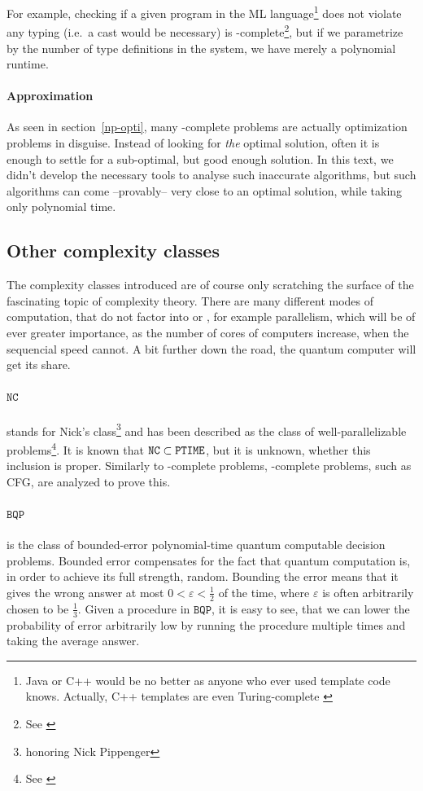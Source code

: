 For example, checking if a given program in the ML language\footnote{Java or
	C++ would be no better as anyone who ever used template code knows. Actually,
	C++ templates are even Turing-complete \cite{veldhuizen2003c++}}
does not violate any typing (i.e.\ a cast would be necessary) is
\NPTIME-complete\footnote{See \cite{downey1999parameterized}}, but if we
parametrize by the number of type definitions in the system, we have merely a
polynomial runtime.
\paragraph{Approximation}
As seen in section~\ref{np-opti}, many \NPTIME-complete problems are actually
optimization problems in disguise. Instead of looking for \emph{the} optimal
solution, often it is enough to settle for a sub-optimal, but good enough
solution.  In this text, we didn't develop the necessary tools to analyse such
inaccurate algorithms, but such algorithms can come --provably-- very close to
an optimal solution, while taking only polynomial time.

\subsection{Other complexity classes}
The complexity classes introduced are of course only scratching the surface 
of the fascinating topic of complexity theory. There are many different modes 
of computation, that do not factor into \PTIME or \NPTIME, for example 
parallelism, which will be of ever greater importance, as the number of cores 
of computers increase, when the sequencial speed cannot. A bit further down 
the road, the quantum computer will get its share.

\paragraph{$\mathtt{NC}$}
stands for Nick's class\footnote{honoring Nick Pippenger} and
has been described as the class of well-parallelizable 
problems\footnote{See \cite{sipser2006introduction}}. It is known that $\mathtt{NC} \subset \mathtt{PTIME}$, but it is unknown, 
whether this inclusion is proper. Similarly to \NPTIME-complete problems, 
\PTIME-complete problems, such as CFG, are analyzed to prove this. 

\paragraph{$\mathtt{BQP}$}
is the class of bounded-error polynomial-time quantum computable decision 
problems. Bounded error compensates for the fact that quantum computation is, 
in order to achieve its full strength, random. Bounding the error means that 
it gives the wrong answer at most $0<\varepsilon<\frac{1}{2}$ of the time, where 
$\varepsilon$ is often arbitrarily chosen to be $\frac{1}{3}$. Given a 
procedure in $\mathtt{BQP}$, it is easy to see, that we can lower the 
probability of error arbitrarily low by running the procedure multiple times 
and taking the average answer.

